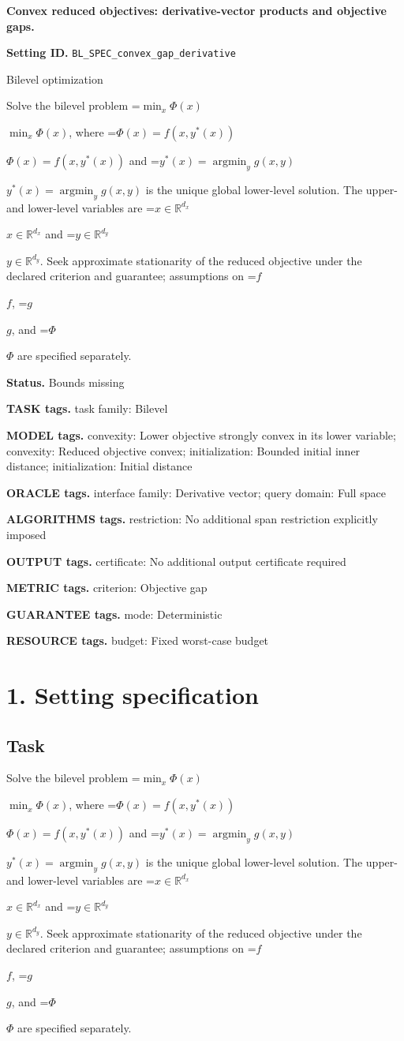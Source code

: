 \documentclass[10pt,a4paper]{article}
\newcommand{\AtlasMath}[1]{\par\begingroup\centering\setbox0=\hbox{$\displaystyle #1$}\ifdim\wd0>1.4\linewidth\typeout{ATLAS WIDE FORMULA: \the\wd0}\fi\ifdim\wd0>\linewidth\resizebox{\linewidth}{!}{\box0}\else\box0\fi\par\endgroup}
\newcommand{\AtlasInlineMath}[1]{\begingroup\setbox0=\hbox{$#1$}\ifdim\wd0>.4\linewidth\endgroup\AtlasMath{#1}\else\endgroup$#1$\fi}
\begin{document}
\raggedright

{\LARGE\bfseries\sffamily\color{AtlasNavy} Convex reduced objectives: derivative-vector products and objective gaps.\par}\vspace{5pt}
\textbf{Setting ID.} \texttt{BL\_\allowbreak{}SPEC\_\allowbreak{}convex\_\allowbreak{}gap\_\allowbreak{}derivative}

Bilevel optimization

Solve the bilevel problem \AtlasInlineMath{\min_x\Phi(x)}, where \AtlasInlineMath{\Phi(x)=f(x,y^*(x))} and \AtlasInlineMath{y^*(x)=\operatorname*{argmin}_y g(x,y)} is the unique global lower-level solution. The upper- and lower-level variables are \AtlasInlineMath{x\in\mathbb{R}^{d_x}} and \AtlasInlineMath{y\in\mathbb{R}^{d_y}}. Seek approximate stationarity of the reduced objective under the declared criterion and guarantee; assumptions on \AtlasInlineMath{f}, \AtlasInlineMath{g}, and \AtlasInlineMath{\Phi} are specified separately.

\textbf{Status.} Bounds missing

\textbf{TASK tags.} task family: Bilevel

\textbf{MODEL tags.} convexity: Lower objective strongly convex in its lower variable; convexity: Reduced objective convex; initialization: Bounded initial inner distance; initialization: Initial distance

\textbf{ORACLE tags.} interface family: Derivative vector; query domain: Full space

\textbf{ALGORITHMS tags.} restriction: No additional span restriction explicitly imposed

\textbf{OUTPUT tags.} certificate: No additional output certificate required

\textbf{METRIC tags.} criterion: Objective gap

\textbf{GUARANTEE tags.} mode: Deterministic

\textbf{RESOURCE tags.} budget: Fixed worst-case budget

\section{1. Setting specification}
\subsection{Task}
Solve the bilevel problem \AtlasInlineMath{\min_x\Phi(x)}, where \AtlasInlineMath{\Phi(x)=f(x,y^*(x))} and \AtlasInlineMath{y^*(x)=\operatorname*{argmin}_y g(x,y)} is the unique global lower-level solution. The upper- and lower-level variables are \AtlasInlineMath{x\in\mathbb{R}^{d_x}} and \AtlasInlineMath{y\in\mathbb{R}^{d_y}}. Seek approximate stationarity of the reduced objective under the declared criterion and guarantee; assumptions on \AtlasInlineMath{f}, \AtlasInlineMath{g}, and \AtlasInlineMath{\Phi} are specified separately.
\end{document}
